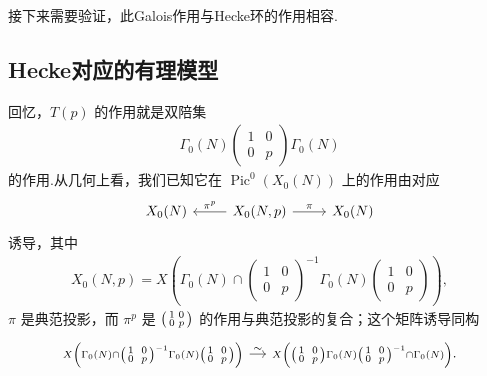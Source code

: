 接下来需要验证，此Galois作用与Hecke环的作用相容.



\subsection{Hecke对应的有理模型}\label{sec:modular-2-3-5}

回忆，$T(p)$ 的作用就是双陪集
\begin{align*}
\Gamma_0(N)\begin{pmatrix}1&0\\0&p\end{pmatrix}\Gamma_0(N)
\end{align*}
的作用.从几何上看，我们已知它在 $\operatorname{Pic}^0(X_0(N))$ 上的作用由对应
\begin{equation*}
\begin{tikzcd}
X_0(N) & X_0(N,p) \arrow[l,"\pi^p"'] \arrow[r,"\pi"] & X_0(N)
\end{tikzcd}
\end{equation*}
诱导，其中
\begin{align*}
X_0(N,p)=X\left(\Gamma_0(N)\cap\begin{pmatrix}1&0\\0&p\end{pmatrix}^{-1}\Gamma_0(N)\begin{pmatrix}1&0\\0&p\end{pmatrix}\right),
\end{align*}
$\pi$ 是典范投影，而 $\pi^p$ 是 $\begin{psmallmatrix}1&0\\0&p\end{psmallmatrix}$ 的作用与典范投影的复合；这个矩阵诱导同构
\begin{equation*}
\begin{tikzcd}[column sep=small]
{\scriptstyle X\left(\Gamma_0(N)\cap\begin{psmallmatrix}1&0\\0&p\end{psmallmatrix}^{-1}\Gamma_0(N)\begin{psmallmatrix}1&0\\0&p\end{psmallmatrix}\right)}
\arrow[r,"\sim"] &
{\scriptstyle X\left(\begin{psmallmatrix}1&0\\0&p\end{psmallmatrix}\Gamma_0(N)\begin{psmallmatrix}1&0\\0&p\end{psmallmatrix}^{-1}\cap\Gamma_0(N)\right)}.
\end{tikzcd}
\end{equation*}
